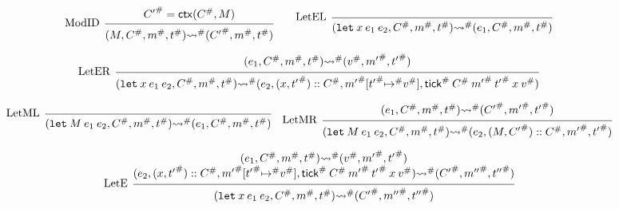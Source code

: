 \documentclass[acmsmall,review]{acmart}\settopmatter{printfolios=true,printccs=false,printacmref=false}
\theoremstyle{definition}
\newcommand*{\cons}{::}
\newcommand*{\A}[1]{{#1}^{\#}}
\newcommand*{\mem}{m}
\newcommand*{\semarrow}{\rightsquigarrow}
\newcommand*{\tick}{\mathsf{tick}}
\newcommand*{\modctx}{\mathsf{ctx}}
\begin{document}
\begin{figure}[h!]
  \[
    \begin{prooftree}
      \hypo{\A{C'}=\modctx(\A{C},M)}
      \infer[left label=ModID]1{
      (M, \A{C}, \A\mem, \A{t})
      \A\semarrow
      (\A{C'}, \A\mem, \A{t})
      }
    \end{prooftree}\qquad
    \begin{prooftree}
      \infer[left label=LetEL]0{
      (\mathtt{let}\:x\:e_1\:e_2, \A{C}, \A\mem, \A{t})
      \A\semarrow
      (e_{1}, \A{C}, \A\mem, \A{t})
      }
    \end{prooftree}
  \]

  \[
    \begin{prooftree}
      \hypo{
        \begin{matrix}
          (e_{1}, \A{C}, \A\mem, \A{t})
          \A\semarrow
          (\A{v}, \A{\mem'}, \A{t'})
        \end{matrix}
      }
      \infer[left label=LetER]1{
      (\mathtt{let}\:x\:e_1\:e_2, \A{C}, \A\mem, \A{t})
      \A\semarrow
      (e_{2}, (x, \A{t'})\cons \A{C}, \A{\mem'}[\A{t'}\A\mapsto \A{v}], \A\tick\:\A{C}\:\A{\mem'}\:\A{t'}\:x\:\A{v})
      }
    \end{prooftree}
  \]

  \[
    \begin{prooftree}
      \infer[left label=LetML]0{
      (\mathtt{let}\:M\:e_{1}\:e_{2}, \A{C}, \A\mem, \A{t})
      \A\semarrow
      (e_{1}, \A{C}, \A\mem, \A{t})
      }
    \end{prooftree}\quad
    \begin{prooftree}
      \hypo{
        \begin{matrix}
          (e_{1}, \A{C}, \A\mem, \A{t})
          \A\semarrow
          (\A{C'}, \A{\mem'}, \A{t'})
        \end{matrix}
      }
      \infer[left label=LetMR]1{
      (\mathtt{let}\:M\:e_{1}\:e_{2}, \A{C}, \A\mem, \A{t})
      \A\semarrow
      (e_{2}, (M, \A{C'})\cons \A{C}, \A{\mem'}, \A{t'})
      }
    \end{prooftree}
  \]

  \[
    \begin{prooftree}
      \hypo{
        \begin{matrix}
          (e_{1}, \A{C}, \A\mem, \A{t})
          \A\semarrow
          (\A{v}, \A{\mem'}, \A{t'}) \\
          (e_{2}, (x, \A{t'})\cons \A{C}, \A{\mem'}[\A{t'}\A\mapsto \A{v}], \A\tick\:\A{C}\:\A{\mem'}\:\A{t'}\:x\:\A{v})
          \A\semarrow
          (\A{C'}, \A{\mem''}, \A{t''})
        \end{matrix}
      }
      \infer[left label=LetE]1{
      (\mathtt{let}\:x\:e_1\:e_2, \A{C}, \A\mem, \A{t})
      \A\semarrow
      (\A{C'}, \A{\mem''}, \A{t''})
      }
    \end{prooftree}
  \]


\end{figure}
\end{document}
